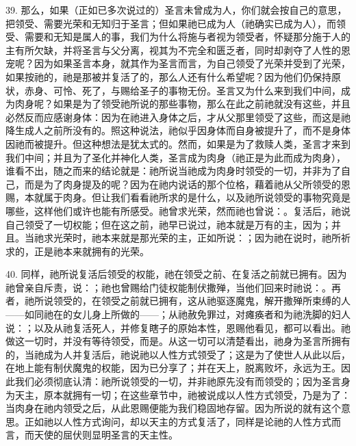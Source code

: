 39. 那么，如果（正如已多次说过的）圣言未曾成为人，你们就会按自己的意思，把领受、需要光荣和无知归于圣言；但如果祂已成为人（祂确实已成为人），而领受、需要和无知是属人的事，我们为什么将施与者视为领受者，怀疑那分施于人的主有所欠缺，并将圣言与父分离，视其为不完全和匮乏者，同时却剥夺了人性的恩宠呢？因为如果圣言本身，就其作为圣言而言，为自己领受了光荣并受到了光荣，如果按祂的，祂是那被并复活了的，那么人还有什么希望呢？因为他们仍保持原状，赤身、可怜、死了，与赐给圣子的事物无份。圣言又为什么来到我们中间，成为肉身呢？如果是为了领受祂所说的那些事物，那么在此之前祂就没有这些，并且必然反而应感谢身体：因为在祂进入身体之后，才从父那里领受了这些，而这是祂降生成人之前所没有的。照这种说法，祂似乎因身体而自身被提升了，而不是身体因祂而被提升。但这种想法是犹太式的。然而，如果是为了救赎人类，圣言才来到我们中间；并且为了圣化并神化人类，圣言成为肉身（祂正是为此而成为肉身），谁看不出，随之而来的结论就是：祂所说当祂成为肉身时领受的一切，并非为了自己，而是为了肉身提及的呢？因为在祂内说话的那个位格，藉着祂从父所领受的恩赐，本就属于肉身。但让我们看看祂所求的是什么，以及祂所说领受的事物究竟是哪些，这样他们或许也能有所感受。祂曾求光荣，然而祂也曾说：。复活后，祂说自己领受了一切权能；但在这之前，祂早已说过，祂本就是万有的主，因为；并且。当祂求光荣时，祂本来就是那光荣的主，正如所说：；因为祂在说时，祂所祈求的，正是祂本来就拥有的光荣。\par

40. 同样，祂所说复活后领受的权能，祂在领受之前、在复活之前就已拥有。因为祂曾亲自斥责，说：；祂也曾赐给门徒权能制伏撒殚，当他们回来时祂说：。再者，祂所说领受的，在领受之前就已拥有，这从祂驱逐魔鬼，解开撒殚所束缚的人——如同祂在的女儿身上所做的——；从祂赦免罪过，对瘫痪者和为祂洗脚的妇人说：；以及从祂复活死人，并修复瞎子的原始本性，恩赐他看见，都可以看出。祂做这一切时，并没有等待领受，而是。从这一切可以清楚看出，祂身为圣言所拥有的，当祂成为人并复活后，祂说祂以人性方式领受了；这是为了使世人从此以后，在地上能有制伏魔鬼的权能，因为已分享了；并在天上，脱离败坏，永远为王。因此我们必须彻底认清：祂所说领受的一切，并非祂原先没有而领受的；因为圣言身为天主，原本就拥有一切；在这些章节中，祂被说成以人性方式领受，乃是为了：当肉身在祂内领受之后，从此恩赐便能为我们稳固地存留。因为所说的就有这个意思。正如祂以人性方式询问，却以天主的方式复活了，同样是论祂的人性方式而言，而天使的屈伏则显明圣言的天主性。\par

